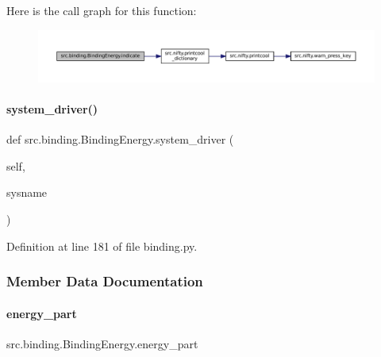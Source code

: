 Here is the call graph for this function\+:
\nopagebreak
\begin{figure}[H]
\begin{center}
\leavevmode
\includegraphics[width=350pt]{classsrc_1_1binding_1_1BindingEnergy_a21124a9de77db1f3c04d6bdbefcb0b22_cgraph}
\end{center}
\end{figure}
\mbox{\label{classsrc_1_1binding_1_1BindingEnergy_a9d1c99fadc807e4b04adc249d730483d}} 
\paragraph{\texorpdfstring{system\+\_\+driver()}{system\_driver()}}
{\footnotesize\ttfamily def src.\+binding.\+Binding\+Energy.\+system\+\_\+driver (\begin{DoxyParamCaption}\item[{}]{self,  }\item[{}]{sysname }\end{DoxyParamCaption})}



Definition at line 181 of file binding.\+py.



\subsubsection{Member Data Documentation}
\mbox{\label{classsrc_1_1binding_1_1BindingEnergy_a91083ec8b983abfdc6ae863c69778f92}} 
\paragraph{\texorpdfstring{energy\+\_\+part}{energy\_part}}
{\footnotesize\ttfamily src.\+binding.\+Binding\+Energy.\+energy\+\_\+part}



